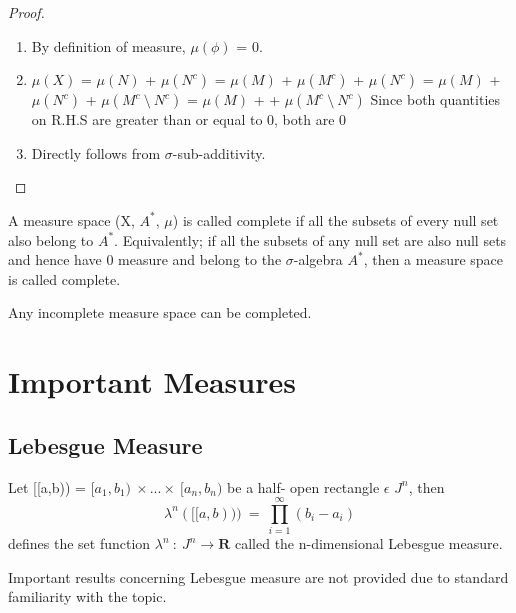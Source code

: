 \begin{proof}
    \begin{enumerate}
        \item By definition of measure, $\mu(\phi)$ = 0.
        \item $\mu(X)$ = $\mu(N)$ + $\mu(N^c)$ = $\mu(M)$ + $\mu(M^c)$
             + $\mu(N^c)$ = $\mu(M)$ + $\mu(N^c)$ + $\mu(M^c \:
            \setminus \: N^c)$
             = $\mu(M)$ +  + $\mu(M^c \: \setminus \: N^c)$
            \newline Since both quantities on R.H.S are greater than or equal
            to 0, both are 0
        \item Directly follows from $\sigma$-sub-additivity.

    \end{enumerate}
\end{proof}
\begin{definition}
    A measure space (X, $A^*$, $\mu$) is called complete if all the subsets of
    every null set also belong to $A^*$. Equivalently; if all the subsets of any
    null set are also null sets and hence have 0 measure and belong to the
    $\sigma$-algebra $A^*$, then a measure space is called complete.
\end{definition}
\begin{theorem}
    Any incomplete measure space can be completed.
\end{theorem}

\section{Important Measures}
\subsection{Lebesgue Measure}
\begin{definition}
    Let [[a,b)) = $[a_1,b_1) \: \times...\times \: [a_n,b_n)$ be a half- open
    rectangle $\epsilon$ $J^n$, then
    \[
        \lambda^n([[a,b))) \: = \: \prod_{i=1}^{\infty}(b_i - a_i)
        \]
        defines the set function $\lambda^n \: : \: J^n \rightarrow \bm{R}$
        called the n-dimensional Lebesgue measure.
\end{definition}
Important results concerning Lebesgue measure are not provided due to standard
familiarity with the topic.

